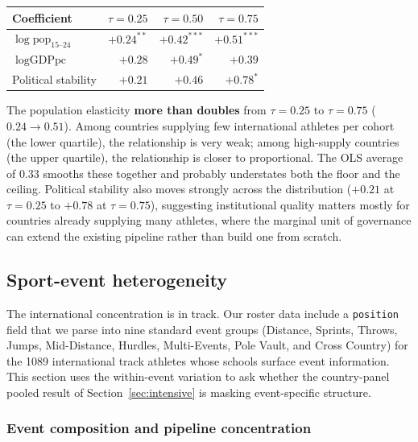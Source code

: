 \documentclass[11pt]{article}
\begin{document}
\begin{center}
\small
\begin{tabular}{lrrr}
\toprule
Coefficient                       & $\tau = 0.25$ & $\tau = 0.50$ & $\tau = 0.75$ \\
\midrule
$\log\text{pop}_{15\text{--}24}$  & $+0.24^{**}$  & $\mathbf{+0.42^{***}}$ & $\mathbf{+0.51^{***}}$ \\
$\log\text{GDPpc}$                & $+0.28$        & $+0.49^{*}$           & $+0.39$ \\
Political stability               & $+0.21$        & $+0.46$               & $+0.78^{*}$ \\
\bottomrule
\end{tabular}
\end{center}

The population elasticity \textbf{more than doubles} from $\tau = 0.25$
to $\tau = 0.75$ ($0.24 \to 0.51$). Among countries supplying few
international athletes per cohort (the lower quartile), the
relationship is very weak; among high-supply countries (the upper
quartile), the relationship is closer to proportional. The OLS
average of $0.33$ smooths these together and probably understates
both the floor and the ceiling. Political stability also moves
strongly across the distribution ($+0.21$ at $\tau = 0.25$ to $+0.78$
at $\tau = 0.75$), suggesting institutional quality matters mostly
for countries already supplying many athletes, where the marginal
unit of governance can extend the existing pipeline rather than
build one from scratch.

\subsection{Sport-event heterogeneity}
\label{sec:event-split}

The international concentration is in track. Our roster data
include a \texttt{position} field that we parse into nine standard
event groups (Distance, Sprints, Throws, Jumps, Mid-Distance,
Hurdles, Multi-Events, Pole Vault, and Cross Country) for the 1089
international track athletes whose schools surface event
information. This section uses the within-event variation to ask
whether the country-panel pooled result of
Section~\ref{sec:intensive} is masking event-specific structure.

\subsubsection*{Event composition and pipeline concentration}
\end{document}
